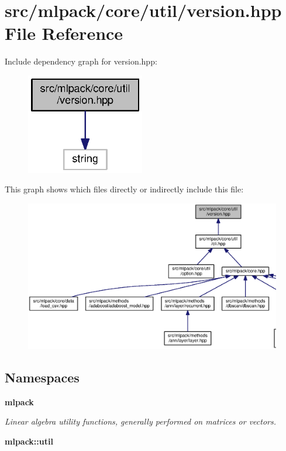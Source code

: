 \section{src/mlpack/core/util/version.hpp File Reference}
\label{src_2mlpack_2core_2util_2version_8hpp}
Include dependency graph for version.\+hpp\+:
\nopagebreak
\begin{figure}[H]
\begin{center}
\leavevmode
\includegraphics[width=146pt]{src_2mlpack_2core_2util_2version_8hpp__incl}
\end{center}
\end{figure}
This graph shows which files directly or indirectly include this file\+:
\nopagebreak
\begin{figure}[H]
\begin{center}
\leavevmode
\includegraphics[width=350pt]{src_2mlpack_2core_2util_2version_8hpp__dep__incl}
\end{center}
\end{figure}
\subsection*{Namespaces}
\begin{DoxyCompactItemize}
\item 
 {\bf mlpack}
\begin{DoxyCompactList}\small\item\em Linear algebra utility functions, generally performed on matrices or vectors. \end{DoxyCompactList}\item 
 {\bf mlpack\+::util}
\end{DoxyCompactItemize}
